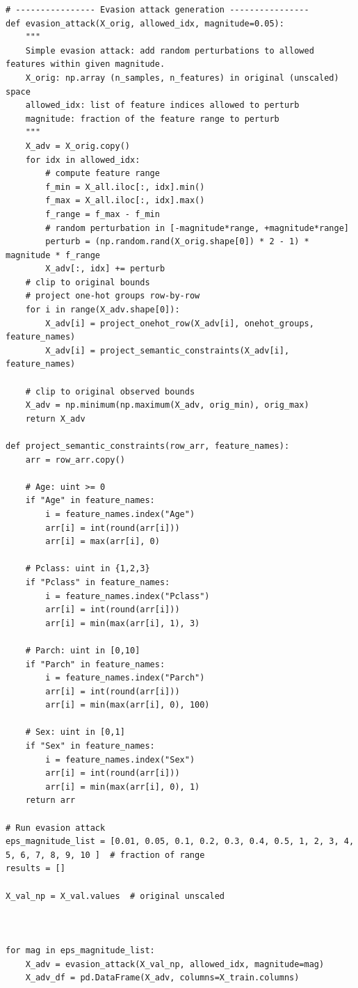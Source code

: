 \documentclass[14pt,a4paper]{extarticle}
\begin{document}
\begin{verbatim}
# ---------------- Evasion attack generation ----------------
def evasion_attack(X_orig, allowed_idx, magnitude=0.05):
    """
    Simple evasion attack: add random perturbations to allowed features within given magnitude.
    X_orig: np.array (n_samples, n_features) in original (unscaled) space
    allowed_idx: list of feature indices allowed to perturb
    magnitude: fraction of the feature range to perturb
    """
    X_adv = X_orig.copy()
    for idx in allowed_idx:
        # compute feature range
        f_min = X_all.iloc[:, idx].min()
        f_max = X_all.iloc[:, idx].max()
        f_range = f_max - f_min
        # random perturbation in [-magnitude*range, +magnitude*range]
        perturb = (np.random.rand(X_orig.shape[0]) * 2 - 1) * magnitude * f_range
        X_adv[:, idx] += perturb
    # clip to original bounds
    # project one-hot groups row-by-row
    for i in range(X_adv.shape[0]):
        X_adv[i] = project_onehot_row(X_adv[i], onehot_groups, feature_names)
        X_adv[i] = project_semantic_constraints(X_adv[i], feature_names)

    # clip to original observed bounds
    X_adv = np.minimum(np.maximum(X_adv, orig_min), orig_max)
    return X_adv

def project_semantic_constraints(row_arr, feature_names):
    arr = row_arr.copy()

    # Age: uint >= 0
    if "Age" in feature_names:
        i = feature_names.index("Age")
        arr[i] = int(round(arr[i]))
        arr[i] = max(arr[i], 0)

    # Pclass: uint in {1,2,3}
    if "Pclass" in feature_names:
        i = feature_names.index("Pclass")
        arr[i] = int(round(arr[i]))
        arr[i] = min(max(arr[i], 1), 3)

    # Parch: uint in [0,10]
    if "Parch" in feature_names:
        i = feature_names.index("Parch")
        arr[i] = int(round(arr[i]))
        arr[i] = min(max(arr[i], 0), 100)

    # Sex: uint in [0,1]
    if "Sex" in feature_names:
        i = feature_names.index("Sex")
        arr[i] = int(round(arr[i]))
        arr[i] = min(max(arr[i], 0), 1)
    return arr

# Run evasion attack
eps_magnitude_list = [0.01, 0.05, 0.1, 0.2, 0.3, 0.4, 0.5, 1, 2, 3, 4, 5, 6, 7, 8, 9, 10 ]  # fraction of range
results = []

X_val_np = X_val.values  # original unscaled



for mag in eps_magnitude_list:
    X_adv = evasion_attack(X_val_np, allowed_idx, magnitude=mag)
    X_adv_df = pd.DataFrame(X_adv, columns=X_train.columns)


\end{verbatim}
\end{document}

